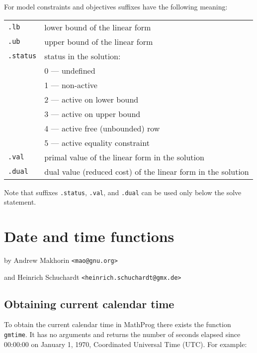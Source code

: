\documentclass[10pt]{article}
\begin{document}
\medskip

For model constraints and objectives suffixes have the following
meaning:

\medskip

\begin{tabular}{@{}p{96pt}p{222pt}@{}}
{\tt.lb}&lower bound of the linear form\\
{\tt.ub}&upper bound of the linear form\\
{\tt.status}&status in the solution:\\
&0 --- undefined\\
&1 --- non-active\\
&2 --- active on lower bound\\
&3 --- active on upper bound\\
&4 --- active free (unbounded) row\\
&5 --- active equality constraint\\
{\tt.val}&primal value of the linear form in the solution\\
{\tt.dual}&dual value (reduced cost) of the linear form in the
solution\\
\end{tabular}

\medskip

Note that suffixes {\tt.status}, {\tt.val}, and {\tt.dual} can be used
only below the solve statement.


\newpage

\section{Date and time functions}

\noindent\hfil
by Andrew Makhorin \verb|<mao@gnu.org>|

\noindent\hfil
and Heinrich Schuchardt \verb|<heinrich.schuchardt@gmx.de>|

\subsection{Obtaining current calendar time}
\label{gmtime}

To obtain the current calendar time in MathProg there exists the
function {\tt gmtime}. It has no arguments and returns the number of
seconds elapsed since 00:00:00 on January 1, 1970, Coordinated
Universal Time (UTC). For example:

\medskip
\end{document}
